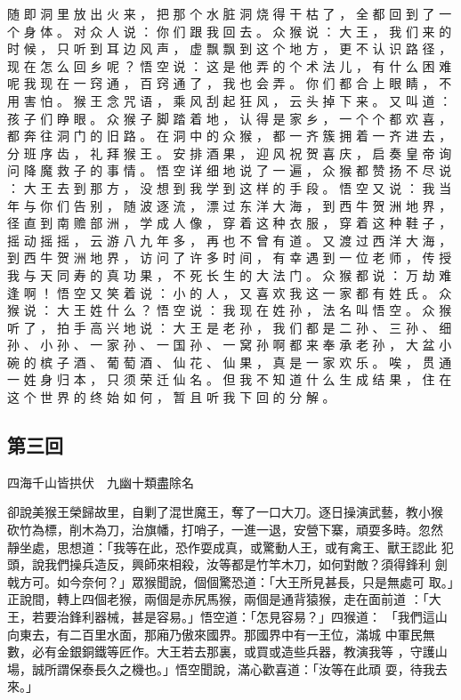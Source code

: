 {随 即 洞 里 放 出 火 来 ， 把 那 个 水 脏 洞 烧 得 干 枯 了 ， 全 都 回 到 了 一 个 身 体 。
对 众 人 说 ： 你 们 跟 我 回 去 。
众 猴 说 ： 大 王 ， 我 们 来 的 时 候 ， 只 听 到 耳 边 风 声 ， 虚 飘 飘 到 这 个 地 方 ， 更 不 认 识 路 径 ， 现 在 怎 么 回 乡 呢 ？ 悟 空 说 ： 这 是 他 弄 的 个 术 法 儿 ， 有 什 么 困 难 呢 我 现 在 一 窍 通 ， 百 窍 通 了 ， 我 也 会 弄 。
你 们 都 合 上 眼 睛 ， 不 用 害 怕 。
猴 王 念 咒 语 ， 乘 风 刮 起 狂 风 ， 云 头 掉 下 来 。
又 叫 道 ： 孩 子 们 睁 眼 。
众 猴 子 脚 踏 着 地 ， 认 得 是 家 乡 ， 一 个 个 都 欢 喜 ， 都 奔 往 洞 门 的 旧 路 。
在 洞 中 的 众 猴 ， 都 一 齐 簇 拥 着 一 齐 进 去 ， 分 班 序 齿 ， 礼 拜 猴 王 。
安 排 酒 果 ， 迎 风 祝 贺 喜 庆 ， 启 奏 皇 帝 询 问 降 魔 救 子 的 事 情 。
悟 空 详 细 地 说 了 一 遍 ， 众 猴 都 赞 扬 不 尽 说 ： 大 王 去 到 那 方 ， 没 想 到 我 学 到 这 样 的 手 段 。
悟 空 又 说 ： 我 当 年 与 你 们 告 别 ， 随 波 逐 流 ， 漂 过 东 洋 大 海 ， 到 西 牛 贺 洲 地 界 ， 径 直 到 南 赡 部 洲 ， 学 成 人 像 ， 穿 着 这 种 衣 服 ， 穿 着 这 种 鞋 子 ， 摇 动 摇 摇 ， 云 游 八 九 年 多 ， 再 也 不 曾 有 道 。
又 渡 过 西 洋 大 海 ， 到 西 牛 贺 洲 地 界 ， 访 问 了 许 多 时 间 ， 有 幸 遇 到 一 位 老 师 ， 传 授 我 与 天 同 寿 的 真 功 果 ， 不 死 长 生 的 大 法 门 。
众 猴 都 说 ： 万 劫 难 逢 啊 ！ 悟 空 又 笑 着 说 ： 小 的 人 ， 又 喜 欢 我 这 一 家 都 有 姓 氏 。
众 猴 说 ： 大 王 姓 什 么 ？ 悟 空 说 ： 我 现 在 姓 孙 ， 法 名 叫 悟 空 。
众 猴 听 了 ， 拍 手 高 兴 地 说 ： 大 王 是 老 孙 ， 我 们 都 是 二 孙 、 三 孙 、 细 孙 、 小 孙 、 一 家 孙 、 一 国 孙 、 一 窝 孙 啊 都 来 奉 承 老 孙 ， 大 盆 小 碗 的 槟 子 酒 、 葡 萄 酒 、 仙 花 、 仙 果 ， 真 是 一 家 欢 乐 。
唉 ， 贯 通 一 姓 身 归 本 ， 只 须 荣 迁 仙 名 。
但 我 不 知 道 什 么 生 成 结 果 ， 住 在 这 个 世 界 的 终 始 如 何 ， 暂 且 听 我 下 回 的 分 解 。
}\switchcolumn\flushpage  \begin{pinyinscope}{\myfontt \section{第三回}     四海千山皆拱伏　九幽十類盡除名

卻說美猴王榮歸故里，自剿了混世魔王，奪了一口大刀。逐日操演武藝，教小猴
砍竹為標，削木為刀，治旗幡，打哨子，一進一退，安營下寨，頑耍多時。忽然
靜坐處，思想道：「我等在此，恐作耍成真，或驚動人王，或有禽王、獸王認此
犯頭，說我們操兵造反，興師來相殺，汝等都是竹竿木刀，如何對敵？須得鋒利
劍戟方可。如今奈何？」眾猴聞說，個個驚恐道：「大王所見甚長，只是無處可
取。」正說間，轉上四個老猴，兩個是赤尻馬猴，兩個是通背猿猴，走在面前道
：「大王，若要治鋒利器械，甚是容易。」悟空道：「怎見容易？」四猴道：
「我們這山向東去，有二百里水面，那廂乃傲來國界。那國界中有一王位，滿城
中軍民無數，必有金銀銅鐵等匠作。大王若去那裏，或買或造些兵器，教演我等
，守護山場，誠所謂保泰長久之機也。」悟空聞說，滿心歡喜道：「汝等在此頑
耍，待我去來。」

}
\end{pinyinscope}
